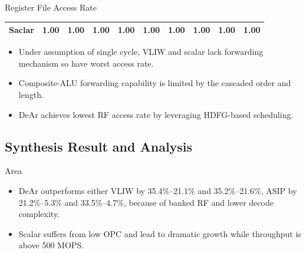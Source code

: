 \documentclass{beamer}
\begin{document}
\begin{CJK}{UTF8}{bkai}
\begin{frame}{Register File Access Rate}
\begin{table}[!ht]
{\begin{tabular}{|c|c|c|c|c|c|c|c|c|c|}
                            Saclar  &   1.00  &   1.00  &   1.00  &   1.00  &   1.00  &   1.00  &   1.00  &   1.00  &   1.00     \\ \hline 
                        \end{tabular}
                    }
                \end{table}
                \begin{itemize}
                    \item <2->{Under assumption of single cycle, VLIW and scalar lack forwarding mechanism so have worst access rate.}
                    \item <3->{Composite-ALU forwarding capability is limited by the cascaded order and length.}
                    \item <4->{DeAr achieves lowest RF access rate by leveraging HDFG-based scheduling.}
                \end{itemize}
            \end{frame}

            \subsection{Synthesis Result and Analysis}

            \begin{frame}{Area}
                \setcounter{subfigure}{0}
                \begin{figure}[t]
                    \begin{center}
                    \end{center}
                \end{figure}
                \begin{itemize}
                    \item <2->{DeAr outperforms either VLIW by 35.4\%--21.1\% and 35.2\%--21.6\%, 
                           ASIP by 21.2\%--5.3\% and 33.5\%--4.7\%, because of banked RF and lower decode complexity.}
                    \item <3->{Scalar suffers from low OPC and lead to dramatic growth while throughput is above 500 MOPS.}
                \end{itemize}
            \end{frame}


\end{CJK}
\end{document}
